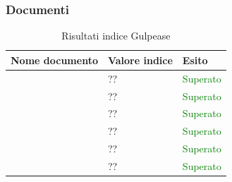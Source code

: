 	 	\subsubsection{Documenti}
		\begin{table}[!ht]
			\begin{center}
				\begin{tabularx}{0.9\textwidth}{|l|l|X|}
					\hline
					\textbf{Nome documento} & \textbf{Valore indice} & \textbf{Esito}\\
					\hline						
					\docNameVersionAdR & ?? & \textcolor{green}{Superato}\\
					\hline
					\docNameVersionGlo & ?? & \textcolor{green}{Superato}\\
					\hline					
					\docNameVersionNdP & ?? & \textcolor{green}{Superato}\\
					\hline					
					\docNameVersionPdP & ?? & \textcolor{green}{Superato}\\
					\hline					
					\docNameVersionPdQ & ?? & \textcolor{green}{Superato}\\
					\hline					
					\docNameVersionSdF & ?? & \textcolor{green}{Superato}\\
					\hline				
				\end{tabularx}
			\end{center}
			\caption{Risultati indice Gulpease}
		\end{table}
	
\pagebreak